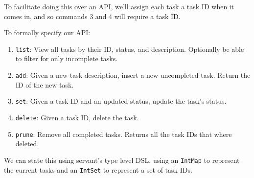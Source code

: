 \documentclass[]{article}
\begin{document}
To facilitate doing this over an API, we'll assign each task a task ID when it
comes in, and so commands 3 and 4 will require a task ID.

To formally specify our API:

\begin{enumerate}
\def\labelenumi{\arabic{enumi}.}
\tightlist
\item
  \texttt{list}: View all tasks by their ID, status, and description. Optionally
  be able to filter for only incomplete tasks.
\item
  \texttt{add}: Given a new task description, insert a new uncompleted task.
  Return the ID of the new task.
\item
  \texttt{set}: Given a task ID and an updated status, update the task's status.
\item
  \texttt{delete}: Given a task ID, delete the task.
\item
  \texttt{prune}: Remove all completed tasks. Returns all the task IDs that
  where deleted.
\end{enumerate}

We can state this using servant's type level DSL, using an \texttt{IntMap} to
represent the current tasks and an \texttt{IntSet} to represent a set of task
IDs.
\end{document}
